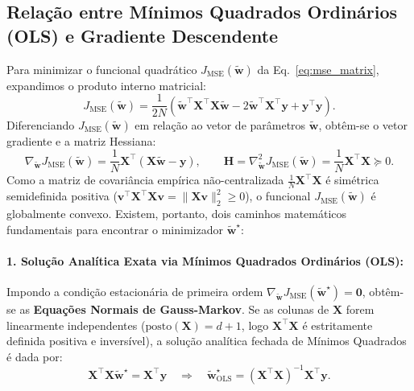 \documentclass[runningheads]{llncs}
\begin{document}
\subsection{Rela\c{c}\~{a}o entre M\'{i}nimos Quadrados Ordin\'{a}rios (OLS) e Gradiente Descendente}
Para minimizar o funcional quadr\'{a}tico $J_{\text{MSE}}(\tilde{\mathbf{w}})$ da Eq.~\eqref{eq:mse_matrix}, expandimos o produto interno matricial:
\begin{equation}
    J_{\text{MSE}}(\tilde{\mathbf{w}}) = \frac{1}{2N}\left(\tilde{\mathbf{w}}^\top \mathbf{X}^\top \mathbf{X} \tilde{\mathbf{w}} - 2\tilde{\mathbf{w}}^\top \mathbf{X}^\top \mathbf{y} + \mathbf{y}^\top \mathbf{y}\right).
\end{equation}
Diferenciando $J_{\text{MSE}}(\tilde{\mathbf{w}})$ em rela\c{c}\~{a}o ao vetor de par\^{a}metros $\tilde{\mathbf{w}}$, obt\^{e}m-se o vetor gradiente e a matriz Hessiana:
\begin{equation}
    \nabla_{\tilde{\mathbf{w}}} J_{\text{MSE}}(\tilde{\mathbf{w}}) = \frac{1}{N}\mathbf{X}^\top (\mathbf{X}\tilde{\mathbf{w}} - \mathbf{y}), \qquad \mathbf{H} = \nabla_{\tilde{\mathbf{w}}}^2 J_{\text{MSE}}(\tilde{\mathbf{w}}) = \frac{1}{N}\mathbf{X}^\top \mathbf{X} \succeq 0.
    \label{eq:grad_hessian_ols}
\end{equation}
Como a matriz de covari\^{a}ncia emp\'{i}rica n\~{a}o-centralizada $\frac{1}{N}\mathbf{X}^\top \mathbf{X}$ \'{e} sim\'{e}trica semidefinida positiva ($\mathbf{v}^\top \mathbf{X}^\top \mathbf{X}\mathbf{v} = \|\mathbf{X}\mathbf{v}\|_2^2 \ge 0$), o funcional $J_{\text{MSE}}(\tilde{\mathbf{w}})$ \'{e} globalmente convexo. Existem, portanto, dois caminhos matem\'{a}ticos fundamentais para encontrar o minimizador $\tilde{\mathbf{w}}^\star$:

\paragraph{1. Solu\c{c}\~{a}o Anal\'{i}tica Exata via M\'{i}nimos Quadrados Ordin\'{a}rios (OLS):}
Impondo a condi\c{c}\~{a}o estacion\'{a}ria de primeira ordem $\nabla_{\tilde{\mathbf{w}}} J_{\text{MSE}}(\tilde{\mathbf{w}}^\star) = \mathbf{0}$, obt\^{e}m-se as \textbf{Equa\c{c}\~{o}es Normais de Gauss-Markov}. Se as colunas de $\mathbf{X}$ forem linearmente independentes ($\text{posto}(\mathbf{X}) = d + 1$, logo $\mathbf{X}^\top \mathbf{X}$ \'{e} estritamente definida positiva e invers\'{i}vel), a solu\c{c}\~{a}o anal\'{i}tica fechada de M\'{i}nimos Quadrados \'{e} dada por:
\begin{equation}
    \mathbf{X}^\top \mathbf{X} \tilde{\mathbf{w}}^\star = \mathbf{X}^\top \mathbf{y} \quad \Longrightarrow \quad \tilde{\mathbf{w}}^\star_{\text{OLS}} = (\mathbf{X}^\top \mathbf{X})^{-1} \mathbf{X}^\top \mathbf{y}.
    \label{eq:ols_normal}
\end{equation}
\end{document}
